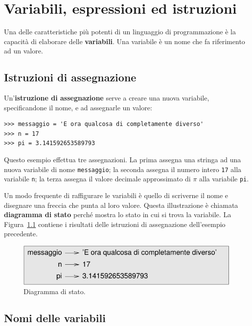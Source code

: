 \documentclass[10pt]{book}
\begin{document}
\chapter{Variabili, espressioni ed istruzioni}

Una delle caratteristiche più potenti di un linguaggio di programmazione è la capacità di elaborare delle {\bf variabili}. Una variabile è un nome che fa riferimento ad un valore.

\section{Istruzioni di assegnazione}
\label{variables}

Un'{\bf istruzione di assegnazione} serve a creare una nuova variabile, specificandone il nome, e ad assegnarle un valore:

\begin{verbatim}
>>> messaggio = 'E ora qualcosa di completamente diverso'
>>> n = 17
>>> pi = 3.141592653589793
\end{verbatim}
%
Questo esempio effettua tre assegnazioni. La prima assegna una stringa
ad una nuova variabile di nome {\tt messaggio}; la seconda assegna il numero intero {\tt 17} alla variabile {\tt n}; la terza assegna il valore decimale approssimato di $\pi$ alla variabile {\tt pi}.

Un modo frequente di raffigurare le variabili è quello di scriverne il nome e disegnare una freccia che punta al loro valore. Questa illustrazione è chiamata {\bf diagramma di stato} perché mostra lo stato in cui si trova la variabile. La Figura~\ref{fig.state2} contiene i risultati delle istruzioni di assegnazione dell'esempio precedente.

\begin{figure}
\centerline
{\includegraphics[scale=0.8]{figs/state2.pdf}}
\caption{Diagramma di stato.}
\label{fig.state2}
\end{figure}

\section{Nomi delle variabili}
\end{document}
